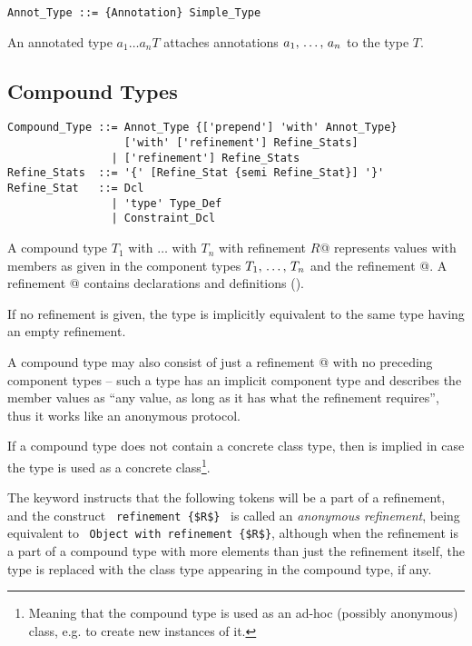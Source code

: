 \syntax\begin{lstlisting}
Annot_Type ::= {Annotation} Simple_Type
\end{lstlisting}

An annotated type $a_1 \ldots a_n T$ attaches annotations $a_1 ,\, \ldots ,\, a_n$ to the type $T$. %






\subsection{Compound Types}
\label{sec:compound-types}

\syntax\begin{lstlisting}
Compound_Type ::= Annot_Type {['prepend'] 'with' Annot_Type} 
                  ['with' ['refinement'] Refine_Stats]
                | ['refinement'] Refine_Stats
Refine_Stats  ::= '{' [Refine_Stat {semi Refine_Stat}] '}'
Refine_Stat   ::= Dcl
                | 'type' Type_Def
                | Constraint_Dcl
\end{lstlisting} %

A compound type \lstinline@$T_1$ with $\ldots$ with $T_n$ with refinement {$R$}@ represents values with members as given in the component types $T_1 ,\, \ldots ,\, T_n$ and the refinement @. A refinement @ contains declarations and definitions (). 

If no refinement is given, the type is implicitly equivalent to the same type having an empty refinement. 

A compound type may also consist of just a refinement @ with no preceding component types -- such a type has an implicit component type  and describes the member values as ``any value, as long as it has what the refinement requires'', thus it works like an anonymous protocol. 

If a compound type does not contain a concrete class type, then  is implied in case the type is used as a concrete class\footnote{Meaning that the compound type is used as an ad-hoc (possibly anonymous) class, e.g. to create new instances of it.}.

The keyword  instructs that the following tokens will be a part of a refinement, and the construct ~\lstinline!refinement {$R$}!~ is called an {\em anonymous refinement}, being equivalent to ~\lstinline!Object with refinement {$R$}!, although when the refinement is a part of a compound type with more elements than just the refinement itself, the  type is replaced with the class type appearing in the compound type, if any. 

